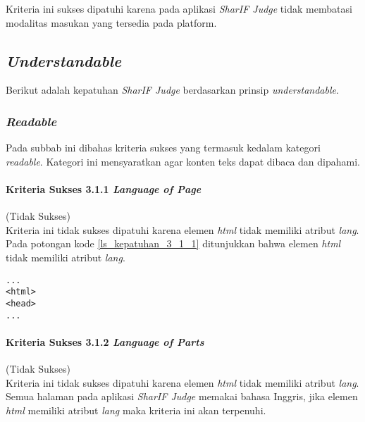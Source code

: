 Kriteria ini sukses dipatuhi karena pada aplikasi \textit{SharIF Judge} tidak membatasi modalitas masukan yang tersedia pada platform.

\subsection{\textit{Understandable}}
\label{subsec:kepatuhan_understandable}

Berikut adalah kepatuhan \textit{SharIF Judge} berdasarkan prinsip \textit{understandable}.

\subsubsection{\textit{Readable}}
\label{subsubsec:readable}

Pada subbab ini dibahas kriteria sukses yang termasuk kedalam kategori \textit{readable}. Kategori ini mensyaratkan agar konten teks dapat dibaca dan dipahami.

\paragraph{Kriteria Sukses 3.1.1 \textit{Language of Page}}
\label{subsubsec:kepatuhan_kriteria_3.1.1}
(Tidak Sukses) \\

Kriteria ini tidak sukses dipatuhi karena elemen \textit{html} tidak memiliki atribut \textit{lang}. Pada potongan kode \ref{ls_kepatuhan_3_1_1} ditunjukkan bahwa elemen \textit{html} tidak memiliki atribut \textit{lang}.
\begin{lstlisting}[basicstyle=\ttfamily, frame=single,
columns=fullflexible, keepspaces=true, breaklines=true, label=ls_kepatuhan_3_1_1, caption=Pelanggaran Kriteria Sukses 3.1.1 - Elemen \textit{HTML} Tidak Memiliki Atribut \textit{lang}]
...
<html>
<head>
...
\end{lstlisting}

\paragraph{Kriteria Sukses 3.1.2 \textit{Language of Parts}}
\label{subsubsec:kepatuhan_kriteria_3.1.2}
(Tidak Sukses) \\

Kriteria ini tidak sukses dipatuhi karena elemen \textit{html} tidak memiliki atribut \textit{lang}. Semua halaman pada aplikasi \textit{SharIF Judge} memakai bahasa Inggris, jika elemen \textit{html} memiliki atribut \textit{lang} maka kriteria ini akan terpenuhi.

